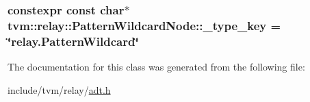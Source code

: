 \subsubsection[{\texorpdfstring{\+\_\+type\+\_\+key}{_type_key}}]{\setlength{\rightskip}{0pt plus 5cm}constexpr const char$\ast$ tvm\+::relay\+::\+Pattern\+Wildcard\+Node\+::\+\_\+type\+\_\+key = \char`\"{}relay.\+Pattern\+Wildcard\char`\"{}\hspace{0.3cm}{\ttfamily [static]}}\hypertarget{classtvm_1_1relay_1_1PatternWildcardNode_aec29789ceabf251361f8abc2017a5f8a}{}\label{classtvm_1_1relay_1_1PatternWildcardNode_aec29789ceabf251361f8abc2017a5f8a}


The documentation for this class was generated from the following file\+:\begin{DoxyCompactItemize}
\item 
include/tvm/relay/\hyperlink{relay_2adt_8h}{adt.\+h}\end{DoxyCompactItemize}
